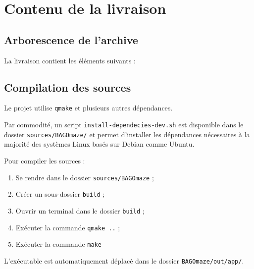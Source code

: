 \chapter{Contenu de la livraison}

\section{Arborescence de l'archive}

La livraison contient les éléments suivants :

\section{Compilation des sources}

Le projet utilise \verb|qmake| et plusieurs autres dépendances.

Par commodité, un script \verb|install-dependecies-dev.sh| est disponible dans le dossier \verb|sources/BAGOmaze/| et permet d'installer les dépendances nécessaires à la majorité des systèmes Linux basés sur Debian comme Ubuntu.

Pour compiler les sources :
\begin{enumerate}
	\item Se rendre dans le dossier \verb|sources/BAGOmaze| ;
	\item Créer un sous-dossier \verb|build| ;
	\item Ouvrir un terminal dans le dossier \verb|build| ;
	\item Exécuter la commande \verb|qmake ..| ;
	\item Exécuter la commande \verb|make|
\end{enumerate}

L'exécutable est automatiquement déplacé dans le dossier \verb|BAGOmaze/out/app/|.
